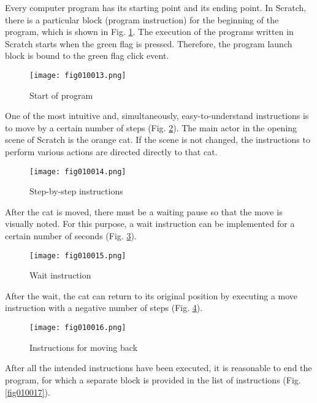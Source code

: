 Every computer program has its starting point and its ending point. In Scratch, there is a particular block (program instruction) for the beginning of the program, which is shown in Fig. \ref{fig010013}. The execution of the programs written in Scratch starts when the green flag is pressed. Therefore, the program launch block is bound to the green flag click event.

\begin{figure}[H]
   \centering
   \texttt{[image: fig010013.png]}
   \caption{Start of program}
\label{fig010013}
\end{figure}

One of the most intuitive and, simultaneously, easy-to-understand instructions is to move by a certain number of steps (Fig. \ref{fig010014}). The main actor in the opening scene of Scratch is the orange cat. If the scene is not changed, the instructions to perform various actions are directed directly to that cat.

\begin{figure}[H]
   \centering
   \texttt{[image: fig010014.png]}
   \caption{Step-by-step instructions}
\label{fig010014}
\end{figure}

After the cat is moved, there must be a waiting pause so that the move is visually noted. For this purpose, a wait instruction can be implemented for a certain number of seconds (Fig. \ref{fig010015}).

\begin{figure}[H]
   \centering
   \texttt{[image: fig010015.png]}
   \caption{Wait instruction}
\label{fig010015}
\end{figure}

After the wait, the cat can return to its original position by executing a move instruction with a negative number of steps (Fig. \ref{fig010016}).

\begin{figure}[H]
   \centering
   \texttt{[image: fig010016.png]}
   \caption{Instructions for moving back}
\label{fig010016}
\end{figure}

After all the intended instructions have been executed, it is reasonable to end the program, for which a separate block is provided in the list of instructions (Fig. \ref{fig010017}).

